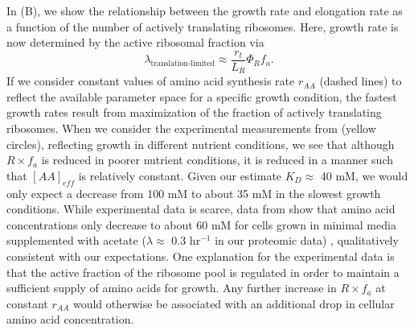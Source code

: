 In (B), we show the relationship between the growth
rate and elongation rate as a function of the number of actively translating
ribosomes. Here, growth rate is now determined by the active ribosomal fraction via
\begin{equation}
\lambda_\text{translation-limited} \approx \frac{r_t}{L_R}  \Phi_R f_a.
\label{eq:translation_limit_growth_rate_2}
\end{equation}
If we consider constant values of amino acid synthesis rate $r_{AA}$ (dashed
lines) to reflect the available parameter space for a specific growth condition,
the fastest growth rates result from  maximization of the fraction of actively translating
ribosomes. When we consider the experimental measurements from \cite{dai2018}
(yellow circles), reflecting growth in different nutrient conditions, we see
that although $R \times f_a$ is reduced in poorer nutrient conditions, it is
reduced in a manner such that $[AA]_{eff}$ is relatively constant. Given our estimate
$K_D \approx$ 40 mM,  we would only expect a decrease from 100 mM to about 35 mM
in the slowest growth conditions. While experimental data is scarce, data from
\cite{bennett2009} show that amino acid
concentrations only decrease to about 60 mM for cells grown in minimal media
supplemented with acetate ($\lambda \approx$  0.3 hr$^{-1}$ in our proteomic data)
\citep{bennett2009}, qualitatively consistent with our expectations. One
explanation for the experimental data is that the active fraction of the
ribosome pool is regulated in order to maintain a sufficient supply of amino acids for
growth. Any further increase in $R \times f_a$ at constant $r_{AA}$ would
otherwise be associated with an additional drop in cellular amino acid
concentration.

\begin{figure*}
    \begin{fullwidth}
    \end{fullwidth}
\end{figure*}


